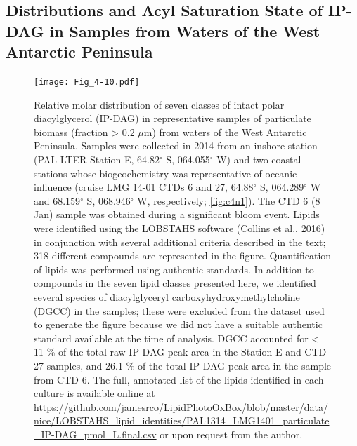 \subsection{Distributions and Acyl Saturation State of IP-DAG in Samples from Waters of the West Antarctic Peninsula}
\begin{figure}[!p]
\centering
\texttt{[image: Fig\_4-10.pdf]}
\caption[Relative molar distribution of seven classes of IP-DAG in representative samples of particulate biomass from waters of the West Antarctic Peninsula]{Relative molar distribution of seven classes of intact polar diacylglycerol (IP-DAG) in representative samples of particulate biomass (fraction \textgreater{} 0.2 $\mu$m) from waters of the West Antarctic Peninsula. Samples were collected in 2014 from an inshore station (PAL-LTER Station E, 64.82$^{\circ}$ S, 064.055$^{\circ}$ W) and two coastal stations whose biogeochemistry was representative of oceanic influence (cruise LMG 14-01 CTDs 6 and 27, 64.88$^{\circ}$ S, 064.289$^{\circ}$ W and 68.159$^{\circ}$ S, 068.946$^{\circ}$ W, respectively; \autoref{fig:c4n1}). The CTD 6 (8 Jan) sample was obtained during a significant bloom event. Lipids were identified using the LOBSTAHS software (Collins et al., 2016) in conjunction with several additional criteria described in the text; 318 different compounds are represented in the figure. Quantification of lipids was performed using authentic standards. In addition to compounds in the seven lipid classes presented here, we identified several species of diacylglyceryl carboxyhydroxymethylcholine (DGCC) in the samples; these were excluded from the dataset used to generate the figure because we did not have a suitable authentic standard available at the time of analysis. DGCC accounted for \textless{} 11 \% of the total raw IP-DAG peak area in the Station E and CTD 27 samples, and 26.1 \% of the total IP-DAG peak area in the sample from CTD 6. The full, annotated list of the lipids identified in each culture is available online at \url{https://github.com/jamesrco/LipidPhotoOxBox/blob/master/data/nice/LOBSTAHS_lipid_identities/PAL1314_LMG1401_particulate_IP-DAG_pmol_L.final.csv} or upon request from the author.}
\label{fig:c4n10}
\end{figure}

